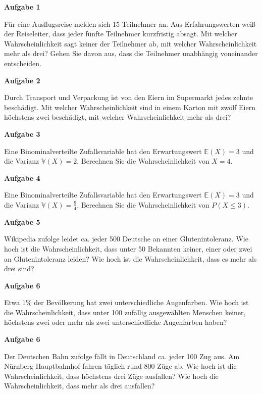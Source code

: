 \documentclass[a4paper,12pt]{article}
\newcommand{\Aufgabe}[1]{
  {
  \vspace*{0.5cm}
  \textsf{\textbf{Aufgabe #1}}
  \vspace*{0.2cm}
  
  }
}
\begin{document}
\Aufgabe{1}
Für eine Ausflugsreise melden sich 15 Teilnehmer an. Aus Erfahrungswerten weiß der Reiseleiter, dass jeder fünfte Teilnehmer kurzfristig absagt. Mit welcher Wahrscheinlichkeit sagt keiner der Teilnehmer ab, mit welcher Wahrscheinlichkeit mehr als drei? Gehen Sie davon aus, dass die Teilnehmer unabhängig voneinander entscheiden.

\Aufgabe{2}
Durch Transport und Verpackung ist von den Eiern im Supermarkt jedes zehnte beschädigt. Mit welcher Wahrscheinlichkeit sind in einem Karton mit zwölf Eiern höchstens zwei beschädigt, mit welcher Wahrscheinlichkeit mehr als drei? 

\Aufgabe{3}
Eine Binominalverteilte Zufallsvariable hat den Erwartungswert $\mathbb{E}(X) = 3$ und die Varianz $\mathbb{V}(X)=2$.
Berechnen Sie die Wahrscheinlichkeit von $X=4$. 



\Aufgabe{4}
Eine Binominalverteilte Zufallsvariable hat den Erwartungswert $\mathbb{E}(X) = 3$ und die Varianz $\mathbb{V}(X)=\frac{9}{4}$.
Berechnen Sie die Wahrscheinlichkeit von $P(X\leq 3) $. 


\Aufgabe{5}
Wikipedia zufolge leidet ca. jeder 500 Deutsche an einer Glutenintoleranz. Wie hoch ist die Wahrscheinlichkeit, dass unter 50 Bekannten keiner, einer oder zwei an Glutenintoleranz leiden? Wie hoch ist die Wahrscheinlichkeit, dass es mehr als drei sind?

\Aufgabe{6}
Etwa 1\% der Bevölkerung hat zwei unterschiedliche Augenfarben. Wie hoch ist die Wahrscheinlichkeit, dass unter 100 zufällig ausgewählten Menschen keiner, höchstens zwei oder mehr als zwei unterschiedliche Augenfarben haben?


\Aufgabe{6}
Der Deutschen Bahn zufolge fällt in Deutschland ca. jeder 100 Zug aus. Am Nürnberg Hauptbahnhof fahren täglich rund 800 Züge ab. Wie hoch ist die Wahrscheinlichkeit, dass höchstens drei Züge ausfallen? Wie hoch die Wahrscheinlichkeit, dass mehr als drei ausfallen?

\end{document}
